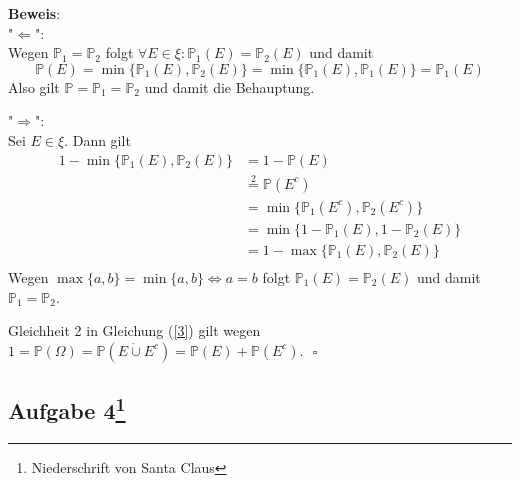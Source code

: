 \documentclass[11pt,a4paper,ngerman]{article}
\newcommand{\set}[1]{ \{ #1 \}}
\newcommand{\Prob}{\mathbb{P}}
\begin{document}
\textbf{Beweis}: \\
"$\Leftarrow$": \\
Wegen $\Prob_1 = \Prob_2$ folgt $\forall E \in \xi: \Prob_1(E) = \Prob_2(E)$ und damit
\begin{equation}
\Prob(E) = \min \set{\Prob_1(E), \Prob_2(E)} = \min \set{\Prob_1(E), \Prob_1(E)} = \Prob_1(E)
\end{equation}
Also gilt $\Prob = \Prob_1 = \Prob_2$ und damit die Behauptung.

"$\Rightarrow$": \\
Sei $E \in \xi$. Dann gilt
\begin{equation}\label{3}\begin{split}
1-\min \set{\Prob_1(E),\Prob_2(E)}
&= 1- \Prob(E) \\
&\stackrel{2}{=} \Prob(E^c)\\
&= \min \set{\Prob_1(E^c),\Prob_2(E^c)} \\
&= \min \set{1-\Prob_1(E),1-\Prob_2(E)} \\
&= 1- \max \set{\Prob_1(E),\Prob_2(E)} \\
\end{split}\end{equation}
Wegen $\max \set{a,b} = \min \set{a,b} \Leftrightarrow a = b$ folgt
$\Prob_1(E) = \Prob_2(E)$ und damit $\Prob_1 = \Prob_2$.

Gleichheit 2 in Gleichung (\ref{3}) gilt wegen $1 = \Prob(\Omega) = \Prob(E \dot{\cup} E^c) = \Prob(E) + \Prob(E^c)$.
$\mbox{}$ \hfill $\square$
\subsection*{Aufgabe 4\footnote{Niederschrift von Santa Claus}}


\label{LastPage}
\end{document}
